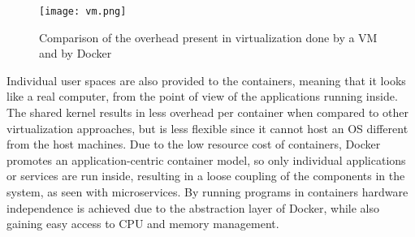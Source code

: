  \begin{figure}[ht]
    \myfloatalign
    \texttt{[image: vm.png]}
    \caption[Comparison of \acs{VM} and Docker]{Comparison of the overhead present in virtualization done by a \acl{VM} and by Docker}
    \label{fig:vm_vs_container}
\end{figure}
 
 Individual user spaces are also provided to the containers, meaning that it looks like a real computer, from the point of view of the applications running inside.
The shared kernel results in less overhead per container when compared to other virtualization approaches, but is less flexible since it cannot host an \ac{OS} different from the host machines. Due to the low resource cost of containers, Docker promotes an application-centric container model\cite{merkel2014docker}, so only individual applications or services are run inside, resulting in a loose coupling of the components in the system, as seen with microservices. 
By running programs in containers hardware independence is achieved due to the abstraction layer of Docker, while also gaining easy access to CPU and memory management.

